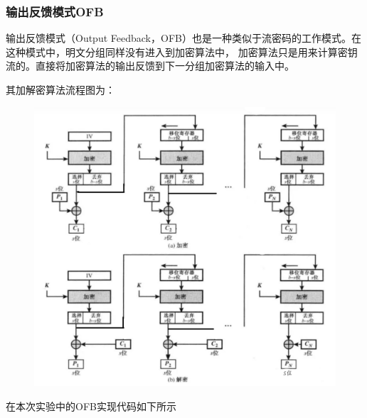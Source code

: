 \documentclass[a4paper,11pt,UTF8]{ctexart}
\newcommand{\bottomcaption}{%
\setlength{\abovecaptionskip}{6pt}%
\setlength{\belowcaptionskip}{6pt}%
\caption}
\newcommand{\xiaowuhao}{\fontsize{9pt}{\baselineskip}\selectfont}   %
\begin{document}
        \subsubsection{输出反馈模式OFB}
            输出反馈模式（Output Feedback，OFB）也是一种类似于流密码的工作模式。在这种模式中，明文分组同样没有进入到加密算法中，
            加密算法只是用来计算密钥流的。直接将加密算法的输出反馈到下一分组加密算法的输入中。\par
            其加解密算法流程图为：
            \begin{figure}[H]
                \centering
                \includegraphics[width=13cm]{OFB.jpg}
                \bottomcaption{\xiaowuhao{OFB加解密流程}}
            \end{figure}
            在本次实验中的OFB实现代码如下所示
            
\end{document}

